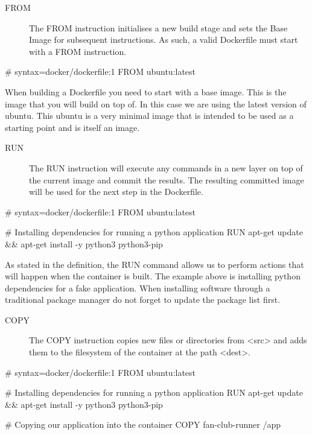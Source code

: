 \documentclass{csse4400}
\begin{document}
\begin{description}
  \item[FROM] The FROM instruction initialises a new build stage and sets the Base Image for subsequent instructions. As such, a valid Dockerfile must start with a FROM instruction. \cite{Dockerfile}
\end{description}

\begin{code}[language=docker,numbers=none]{}
# syntax=docker/dockerfile:1
FROM ubuntu:latest
\end{code}

When building a Dockerfile you need to start with a base image. This is the image that you will build on top of. In this case we are using the latest version of ubuntu. This ubuntu is a very minimal image that is intended to be used as a starting point and is itself an image.

\begin{description}
  \item[RUN] The RUN instruction will execute any commands in a new layer on top of the current image and commit the results. The resulting committed image will be used for the next step in the Dockerfile. \cite{Dockerfile}
\end{description}

\begin{code}[language=docker,numbers=none]{}
  # syntax=docker/dockerfile:1
  FROM ubuntu:latest

  # Installing dependencies for running a python application
  RUN apt-get update && apt-get install -y python3 python3-pip
\end{code}

As stated in the definition, the RUN command allows us to perform actions that will happen when the container is built. The example above is installing python dependencies for a fake application. When installing software through a traditional package manager do not forget to update the package list first.

\begin{description}
  \item[COPY] The COPY instruction copies new files or directories from <src> and adds them to the filesystem of the container at the path <dest>. \cite{Dockerfile}
\end{description}

\begin{code}[language=docker,numbers=none]{}
  # syntax=docker/dockerfile:1
  FROM ubuntu:latest

  # Installing dependencies for running a python application
  RUN apt-get update && apt-get install -y python3 python3-pip

  # Copying our application into the container
  COPY fan-club-runner /app
\end{code}
\end{document}
